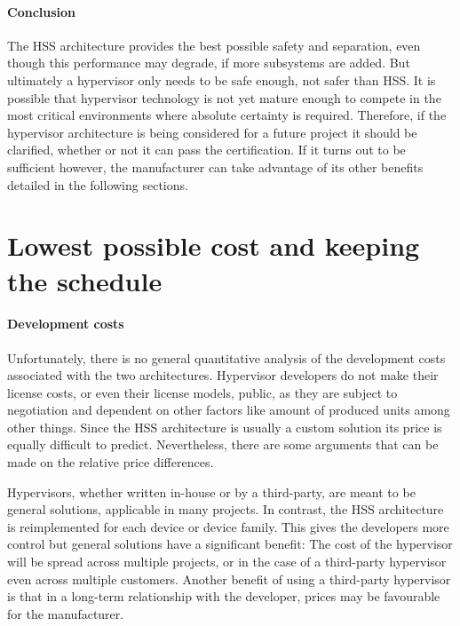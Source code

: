 \paragraph{Conclusion}
The \gls{HSS} architecture provides the best possible safety and separation, even though this performance may degrade, if more subsystems are added. But ultimately a hypervisor only needs to be safe enough, not safer than \gls{HSS}. It is possible that hypervisor technology is not yet mature enough to compete in the most critical environments where absolute certainty is required. Therefore, if the hypervisor architecture is being considered for a future project it should be clarified, whether or not it can pass the certification. If it turns out to be sufficient however, the manufacturer can take advantage of its other benefits detailed in the following sections.



\section{Lowest possible cost and keeping the schedule}
\paragraph{Development costs}
Unfortunately, there is no general quantitative analysis of the development costs associated with the two architectures. Hypervisor developers do not make their license costs, or even their license models, public, as they are subject to negotiation and dependent on other factors like amount of produced units among other things. Since the \gls{HSS} architecture is usually a custom solution its price is equally difficult to predict. Nevertheless, there are some arguments that can be made on the relative price differences. 

Hypervisors, whether written in-house or by a third-party, are meant to be general solutions, applicable in many projects. In contrast, the \gls{HSS} architecture is reimplemented for each device or device family. This gives the developers more control but general solutions have a significant benefit: The cost of the hypervisor will be spread across multiple projects, or in the case of a third-party hypervisor even across multiple customers. Another benefit of using a third-party hypervisor is that in a long-term relationship with the developer, prices may be favourable for the manufacturer.

